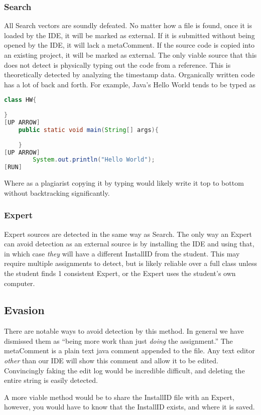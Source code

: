 \documentclass[letterpaper,10pt,conference]{IEEEtran}
\newcommand{\installID}{InstallID\xspace}
\newcommand{\metaComment}{metaComment\xspace}
\begin{document}
	\subsubsection{Search}
		All Search vectors are soundly defeated.  No matter how a file is found, once it is loaded by the IDE, it will be marked as external. If it is submitted without being opened by the IDE, it will lack a \metaComment.  If the source code is copied into an existing project, it will be marked as external.  The only viable source that this does not detect is physically typing out the code from a reference.  This is theoretically detected by analyzing the timestamp data.  Organically written code has a lot of back and forth.  For example, Java's Hello World tends to be typed as 
\begin{lstlisting}[language=Java]
class HW{
		
}
[UP ARROW]
	public static void main(String[] args){
	
	}
[UP ARROW]
		System.out.println("Hello World");
[RUN]
\end{lstlisting}
Where as a plagiarist copying it by typing would likely write it top to bottom without backtracking significantly.
	\subsubsection{Expert} 
	Expert sources are detected in the same way as Search.  The only way an Expert can avoid detection as an external source is by installing the IDE and using that, in which case \textit{they} will have a different \installID from the student.  This may require multiple assignments to detect, but is likely reliable over a full class unless the student finds 1 consistent Expert, or the Expert uses the student's own computer.
\subsection{Evasion}
There are notable ways to avoid detection by this method.  In general we have dismissed them as ``being more work than just \textit{doing} the assignment.''  The \metaComment is a plain text java comment appended to the file.  Any text editor \textit{other} than our IDE will show this comment and allow it to be edited.  Convincingly faking the edit log would be incredible difficult, and deleting the entire string is easily detected.
            
A more viable method would be to share the \installID file with an Expert, however, you would have to know that the \installID exists, and where it is saved.
\end{document}
